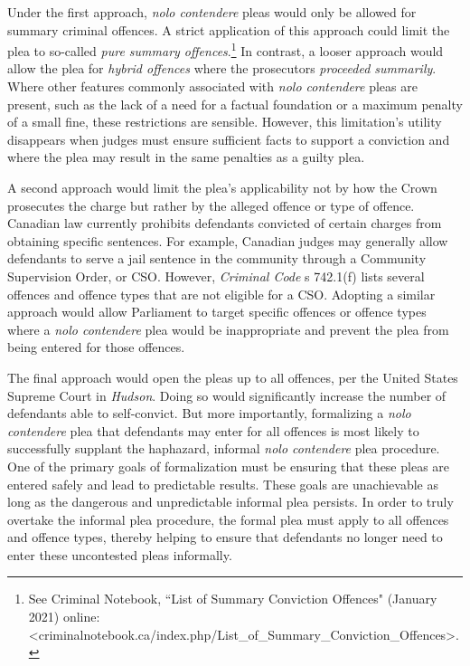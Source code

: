 Under the first approach, \textit{nolo contendere} pleas would only be allowed for summary criminal offences. A strict application of this approach could limit the plea to so-called \textit{pure summary offences}.\footnote{See Criminal Notebook, ``List of Summary Conviction Offences" (January 2021) online: \textless criminalnotebook.ca/index.php/List\_of\_Summary\_Conviction\_Offences\textgreater.} In contrast, a looser approach would allow the plea for \textit{hybrid offences} where the prosecutors \textit{proceeded summarily}. Where other features commonly associated with \textit{nolo contendere} pleas are present, such as the lack of a need for a factual foundation or a maximum penalty of a small fine, these restrictions are sensible. However, this limitation's utility disappears when judges must ensure sufficient facts to support a conviction and where the plea may result in the same penalties as a guilty plea. 

A second approach would limit the plea's applicability not by how the Crown prosecutes the charge but rather by the alleged offence or type of offence. Canadian law currently prohibits defendants convicted of certain charges from obtaining specific sentences. For example, Canadian judges may generally allow defendants to serve a jail sentence in the community through a Community Supervision Order, or CSO. However, \textit{Criminal Code} s 742.1(f) lists several offences and offence types that are not eligible for a CSO. Adopting a similar approach would allow Parliament to target specific offences or offence types where a \textit{nolo contendere} plea would be inappropriate and prevent the plea from being entered for those offences.

The final approach would open the pleas up to all offences, per the United States Supreme Court in \textit{Hudson}. Doing so would significantly increase the number of defendants able to self-convict. But more importantly, formalizing a \textit{nolo contendere} plea that defendants may enter for all offences is most likely to successfully supplant the haphazard, informal \textit{nolo contendere} plea procedure. One of the primary goals of formalization must be ensuring that these pleas are entered safely and lead to predictable results. These goals are unachievable as long as the dangerous and unpredictable informal plea persists. In order to truly overtake the informal plea procedure, the formal plea must apply to all offences and offence types, thereby helping to ensure that defendants no longer need to enter these uncontested pleas informally.

